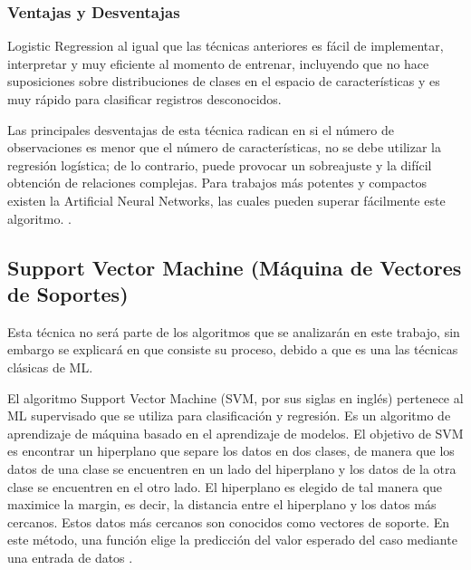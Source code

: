\doublespacing
\subsubsection{Ventajas y Desventajas}
Logistic Regression al igual que las técnicas anteriores es fácil de implementar, interpretar y muy eficiente al momento de entrenar, incluyendo que no hace suposiciones sobre distribuciones de clases en el espacio de características y es muy rápido para clasificar registros desconocidos.\\
\par Las principales desventajas de esta técnica radican en si el número de observaciones es menor que el número de características, no se debe utilizar la regresión logística; de lo contrario, puede provocar un sobreajuste y la difícil obtención de relaciones complejas.  Para trabajos más potentes y compactos existen la Artificial Neural Networks, las cuales pueden superar fácilmente este algoritmo. \cite{Harrington2012}. \\


\doublespacing
\subsection{Support Vector Machine (Máquina de Vectores de Soportes)}
Esta técnica no será parte de los algoritmos que se analizarán en este trabajo, sin embargo se explicará en que consiste su proceso, debido a que es una las técnicas clásicas de ML.\\ 
\par El algoritmo Support Vector Machine (SVM, por sus siglas en inglés) pertenece al ML supervisado que se utiliza para clasificación y regresión. Es un algoritmo de aprendizaje de máquina basado en el aprendizaje de modelos. El objetivo de SVM es encontrar un hiperplano que separe los datos en dos clases, de manera que los datos de una clase se encuentren en un lado del hiperplano y los datos de la otra clase se encuentren en el otro lado. El hiperplano es elegido de tal manera que maximice la margin, es decir, la distancia entre el hiperplano y los datos más cercanos. Estos datos más cercanos son conocidos como vectores de soporte. En este método, una función elige la predicción del valor esperado del caso mediante una entrada de datos \cite{Dantas2021}.\\


\doublespacing
